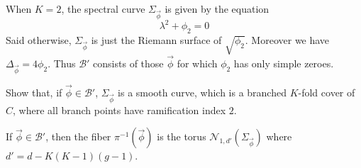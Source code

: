 \documentclass[12pt,letterpaper,reqno]{article}
\numberwithin{equation}{section}
\newcommand{\cB}{\ensuremath{\mathcal B}}
\newcommand{\cM}{\ensuremath{\mathcal M}}
\newcommand{\cN}{\ensuremath{\mathcal N}}
\begin{document}
\begin{example}[Spectral curves and smooth locus for $K=2$] When $K=2$, the spectral curve $\Sigma_{\vec\phi}$ is given by the equation
\begin{equation}
  \lambda^2 + \phi_2 = 0
\end{equation}
Said otherwise, $\Sigma_{\vec\phi}$ 
is just the Riemann surface of $\sqrt{\phi_2}$.
Moreover we have $\Delta_{\vec\phi} = 4 \phi_2$.
Thus $\cB'$ consists of those $\vec\phi$ for which
$\phi_2$ has only simple zeroes.
\end{example}

\begin{exercise} Show that, if $\vec\phi \in \cB'$,
$\Sigma_{\vec\phi}$ is a smooth curve, which is a branched $K$-fold
cover of $C$, where all branch points have ramification index $2$.
\end{exercise}


\begin{prop}
If $\vec\phi \in \cB'$, then
the fiber $\pi^{-1}(\vec\phi)$ is the torus $\cN_{1,d'}(\Sigma_{\vec\phi})$
where $d' = d - K(K-1)(g-1)$.
\end{prop}
\end{document}
